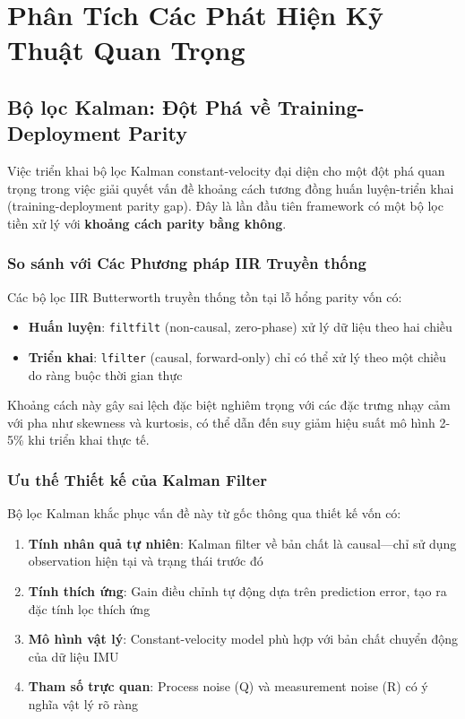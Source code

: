 \section{Phân Tích Các Phát Hiện Kỹ Thuật Quan Trọng}

\subsection{Bộ lọc Kalman: Đột Phá về Training-Deployment Parity}
\label{sec:disc_kalman_parity}

Việc triển khai bộ lọc Kalman constant-velocity đại diện cho một đột phá quan trọng trong việc giải quyết vấn đề khoảng cách tương đồng huấn luyện-triển khai (training-deployment parity gap). Đây là lần đầu tiên framework có một bộ lọc tiền xử lý với \textbf{khoảng cách parity bằng không}.

\subsubsection{So sánh với Các Phương pháp IIR Truyền thống}
Các bộ lọc IIR Butterworth truyền thống tồn tại lỗ hổng parity vốn có:
\begin{itemize}
    \item \textbf{Huấn luyện}: \texttt{filtfilt} (non-causal, zero-phase) xử lý dữ liệu theo hai chiều
    \item \textbf{Triển khai}: \texttt{lfilter} (causal, forward-only) chỉ có thể xử lý theo một chiều do ràng buộc thời gian thực
\end{itemize}

Khoảng cách này gây sai lệch đặc biệt nghiêm trọng với các đặc trưng nhạy cảm với pha như skewness và kurtosis, có thể dẫn đến suy giảm hiệu suất mô hình 2-5\% khi triển khai thực tế.

\subsubsection{Ưu thế Thiết kế của Kalman Filter}
Bộ lọc Kalman khắc phục vấn đề này từ gốc thông qua thiết kế vốn có:
\begin{enumerate}
    \item \textbf{Tính nhân quả tự nhiên}: Kalman filter về bản chất là causal---chỉ sử dụng observation hiện tại và trạng thái trước đó
    \item \textbf{Tính thích ứng}: Gain điều chỉnh tự động dựa trên prediction error, tạo ra đặc tính lọc thích ứng
    \item \textbf{Mô hình vật lý}: Constant-velocity model phù hợp với bản chất chuyển động của dữ liệu IMU
    \item \textbf{Tham số trực quan}: Process noise (Q) và measurement noise (R) có ý nghĩa vật lý rõ ràng
\end{enumerate}

